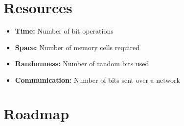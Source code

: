 \section*{Resources}
\begin{itemize}
    \item \textbf{Time:} Number of bit operations
    \item \textbf{Space:} Number of memory cells required
    \item \textbf{Randomness:} Number of random bits used
    \item \textbf{Communication:} Number of bits sent over a network
\end{itemize}

\section*{Roadmap}
